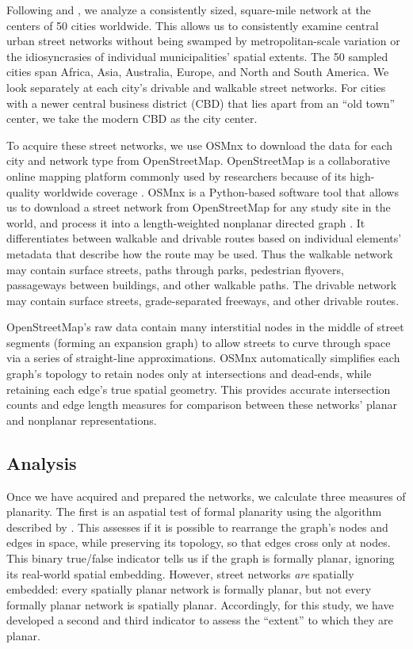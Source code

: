 \documentclass[Afour,sageh,times]{sagej}
\begin{document}
Following \citet{jacobs_great_1995} and \citet{cardillo_structural_2006}, we analyze a consistently sized, square-mile network at the centers of 50 cities worldwide. This allows us to consistently examine central urban street networks without being swamped by metropolitan-scale variation or the idiosyncrasies of individual municipalities' spatial extents. The 50 sampled cities span Africa, Asia, Australia, Europe, and North and South America. We look separately at each city's drivable and walkable street networks. For cities with a newer central business district (CBD) that lies apart from an \enquote{old town} center, we take the modern CBD as the city center.

To acquire these street networks, we use OSMnx to download the data for each city and network type from OpenStreetMap. OpenStreetMap is a collaborative online mapping platform commonly used by researchers because of its high-quality worldwide coverage \citep{haklay_how_2010,jokar_arsanjani_openstreetmap_2015}. OSMnx is a Python-based software tool that allows us to download a street network from OpenStreetMap for any study site in the world, and process it into a length-weighted nonplanar directed graph \citep{boeing_osmnx:_2017}. It differentiates between walkable and drivable routes based on individual elements' metadata that describe how the route may be used. Thus the walkable network may contain surface streets, paths through parks, pedestrian flyovers, passageways between buildings, and other walkable paths. The drivable network may contain surface streets, grade-separated freeways, and other drivable routes.

OpenStreetMap's raw data contain many interstitial nodes in the middle of street segments (forming an expansion graph) to allow streets to curve through space via a series of straight-line approximations. OSMnx automatically simplifies each graph's topology to retain nodes only at intersections and dead-ends, while retaining each edge's true spatial geometry. This provides accurate intersection counts and edge length measures for comparison between these networks' planar and nonplanar representations.

\subsection{Analysis}

Once we have acquired and prepared the networks, we calculate three measures of planarity. The first is an aspatial test of formal planarity using the algorithm described by \citet{boyer_subgraph_2012}. This assesses if it is possible to rearrange the graph's nodes and edges in space, while preserving its topology, so that edges cross only at nodes. This binary true/false indicator tells us if the graph is formally planar, ignoring its real-world spatial embedding. However, street networks \emph{are} spatially embedded: every spatially planar network is formally planar, but not every formally planar network is spatially planar. Accordingly, for this study, we have developed a second and third indicator to assess the \enquote{extent} to which they are planar.
\end{document}
